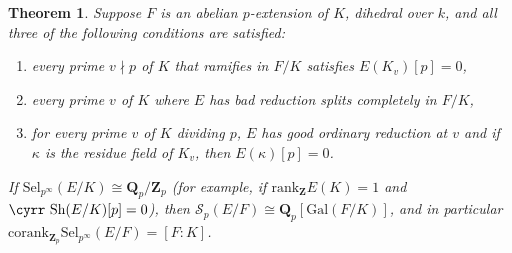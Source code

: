 \documentclass[reqno]{amsart}
\newtheorem{thm}{Theorem}[section]
\theoremstyle{definition}
\renewcommand{\theenumi}{(\roman{enumi})}
\def\Sh{\mbox{\cyrr Sh}}
\def\Z{\mathbf{Z}}
\def\Q{\mathbf{Q}}
\def\Zp{\Z_p}
\def\Qp{\Q_p}
\def\cS{\mathcal{S}}
\def\Gal{\mathrm{Gal}}
\def\rk{\mathrm{rank}}
\def\cork{\mathrm{corank}}
\def\Sel{\mathrm{Sel}}
\def\Scp{\cS_p}
\def\k{k}
\begin{document}
\begin{thm}
\label{fourth}
Suppose $F$ is an abelian $p$-extension of $K$, dihedral over $\k$, and 
all three of the following conditions are satisfied:
\begin{enumerate}
\renewcommand{\theenumi}{(\alph{enumi})}
\item
every prime $v \nmid p$ of $K$ that ramifies in $F/K$ satisfies $E(K_v)[p] = 0$,
\item
every prime $v$ of $K$ where $E$ has bad 
reduction splits completely in $F/K$,
\item
for every prime $v$ of $K$ dividing $p$, 
$E$ has good ordinary reduction at $v$ and if $\kappa$ is the 
residue field of $K_v$, then $E(\kappa)[p] = 0$.
\end{enumerate}
If $\Sel_{p^\infty}(E/K) \cong \Qp/\Zp$ 
(for example, if $\rk_\Z E(K) = 1$ and $\Sh(E/K)[p] = 0$), then 
$\Scp(E/F) \cong \Qp[\Gal(F/K)]$, 
and in particular $\cork_{\Zp}\Sel_{p^\infty}(E/F) = [F:K]$.
\end{thm}
\end{document}
